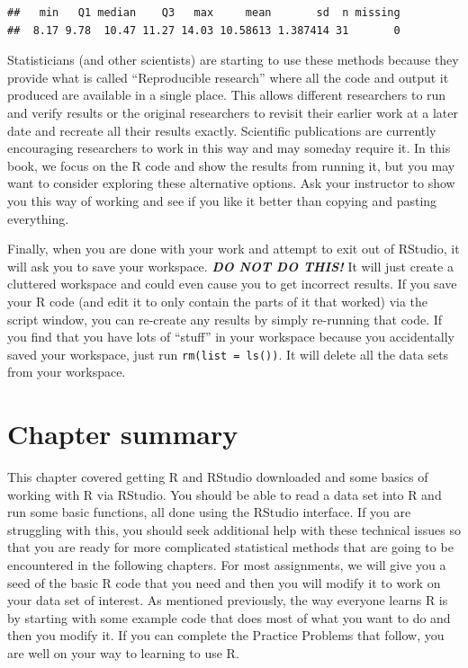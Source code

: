 \documentclass[]{book}
\renewcommand{\indent}{\hspace{15pt}}
\begin{document}
\begin{verbatim}
##   min   Q1 median    Q3   max     mean       sd  n missing
##  8.17 9.78  10.47 11.27 14.03 10.58613 1.387414 31       0
\end{verbatim}

\indent Statisticians (and other scientists) are starting to use these methods
because they provide what is called ``Reproducible
research'' \citep{Gandrud2015} where all the code and output it produced are
available in a single place. This allows different researchers to run and verify
results or the original researchers to revisit their earlier work at a later
date and recreate all their results exactly. Scientific publications are currently
encouraging researchers to work in this way and may someday require it. In this
book, we focus on the R code and show the results from running it, but you may
want to consider exploring these alternative options. Ask your instructor to show
you this way of working and see if you like it better than copying and pasting everything.

\indent Finally, when you are done with your work and attempt to exit out of RStudio,
it will
ask you to save your workspace. \textbf{\emph{DO NOT DO THIS!}} It will just create a cluttered
workspace and could even cause you to get incorrect results. If you
save your R code (and edit it to only contain the parts of it that worked) via the
script window, you can re-create any results by simply
re-running that code. If you find that you have lots of ``stuff'' in your
workspace because you accidentally saved your workspace, just run \texttt{rm(list\ =\ ls())}.
It will delete all the data sets from your workspace.

\hypertarget{section1-4}{%
\section{Chapter summary}\label{section1-4}}

This chapter covered getting R and RStudio downloaded and some basics of working with
R via RStudio. You should be able to read a data set into R and run some basic
functions, all done using the RStudio interface. If you are struggling with
this, you should seek additional help with these technical issues so that you
are ready for more complicated statistical methods that are going to be
encountered in the following chapters. For most assignments, we will give you a
seed of the basic R code that you need and then you will modify it to work on
your data set of interest. As mentioned previously, the way everyone learns R is
by starting with some example code that does most of what you want to do and
then you modify it. If you can complete the Practice Problems that follow, you
are well on your way to learning to use R.
\end{document}
